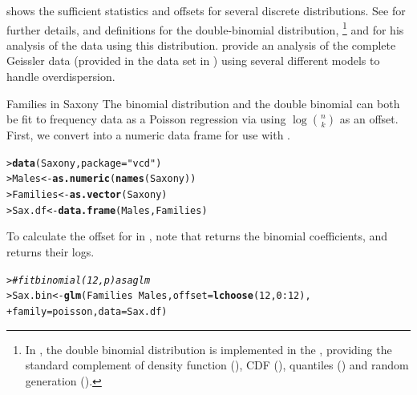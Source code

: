 \documentclass[10pt,krantz2]{krantz}\usepackage[]{graphicx}\usepackage[]{color}
\makeatletter
\newcommand{\hlnum}[1]{\textcolor[rgb]{0.686,0.059,0.569}{#1}}%
\newcommand{\hlstr}[1]{\textcolor[rgb]{0.192,0.494,0.8}{#1}}%
\newcommand{\hlcom}[1]{\textcolor[rgb]{0.678,0.584,0.686}{\textit{#1}}}%
\newcommand{\hlopt}[1]{\textcolor[rgb]{0,0,0}{#1}}%
\newcommand{\hlstd}[1]{\textcolor[rgb]{0.345,0.345,0.345}{#1}}%
\newcommand{\hlkwb}[1]{\textcolor[rgb]{0.69,0.353,0.396}{#1}}%
\newcommand{\hlkwc}[1]{\textcolor[rgb]{0.333,0.667,0.333}{#1}}%
\newcommand{\hlkwd}[1]{\textcolor[rgb]{0.737,0.353,0.396}{\textbf{#1}}}%
\newenvironment{kframe}{%
 \def\at@end@of@kframe{}%
 \ifinner\ifhmode%
  \def\at@end@of@kframe{\end{minipage}}%
  \begin{minipage}{\columnwidth}%
 \fi\fi%
 \def\FrameCommand##1{\hskip\@totalleftmargin \hskip-\fboxsep
 \colorbox{shadecolor}{##1}\hskip-\fboxsep
     \hskip-\linewidth \hskip-\@totalleftmargin \hskip\columnwidth}%
 \MakeFramed {\advance\hsize-\width
   \@totalleftmargin\z@ \linewidth\hsize
   \@setminipage}}%
 {\par\unskip\endMakeFramed%
 \at@end@of@kframe}
\newenvironment{knitrout}{}{} %
\renewenvironment{knitrout}{\small\renewcommand{\baselinestretch}{.85}}{} %
\makeatother
\begin{document}
 shows the sufficient statistics and
offsets for several discrete distributions.
See \citet{LindseyMersch:92} for further details, and definitions
for the double-binomial distribution,%
\footnote{
In \R, the double binomial distribution is implemented in the
, providing the standard complement of
density function (), CDF (),
quantiles ()
and random generation ().
}
and \citet[pp. 130--133]{Lindsey:95}
for his analysis of the  data using this distribution.
\citet{LindseyAltham:1998} provide an analysis of the
complete Geissler data (provided in the data set  in )
using several different models to
handle overdispersion.


\begin{Example}[saxony2]{Families in Saxony}
The binomial distribution and the double binomial can both be fit to frequency data as a Poisson regression via 
using $\log \binom{n}{k}$ as an offset.
First, we convert  into a numeric data frame for use with .
\begin{knitrout}
\color{fgcolor}\begin{kframe}
\begin{alltt}
\hlstd{> }\hlkwd{data}\hlstd{(Saxony,} \hlkwc{package}\hlstd{=}\hlstr{"vcd"}\hlstd{)}
\hlstd{> }\hlstd{Males} \hlkwb{<-} \hlkwd{as.numeric}\hlstd{(}\hlkwd{names}\hlstd{(Saxony))}
\hlstd{> }\hlstd{Families} \hlkwb{<-} \hlkwd{as.vector}\hlstd{(Saxony)}
\hlstd{> }\hlstd{Sax.df} \hlkwb{<-} \hlkwd{data.frame}\hlstd{(Males, Families)}
\end{alltt}
\end{kframe}
\end{knitrout}
To calculate the offset  for  in \R,
note that  returns the
binomial coefficients, and  returns their logs.
\begin{knitrout}
\color{fgcolor}\begin{kframe}
\begin{alltt}
\hlstd{> }\hlcom{# fit binomial (12, p) as a glm}
\hlstd{> }\hlstd{Sax.bin} \hlkwb{<-} \hlkwd{glm}\hlstd{(Families} \hlopt{~} \hlstd{Males,} \hlkwc{offset}\hlstd{=}\hlkwd{lchoose}\hlstd{(}\hlnum{12}\hlstd{,}\hlnum{0}\hlopt{:}\hlnum{12}\hlstd{),}
\hlstd{+ }               \hlkwc{family}\hlstd{=poisson,} \hlkwc{data}\hlstd{=Sax.df)}

\end{alltt}
\end{kframe}
\end{knitrout}
\end{Example}
\end{document}
